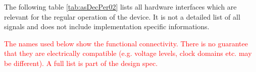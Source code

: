 The following table \ref{tab:asDecPer02} lists all hardware interfaces which are relevant for the regular operation of the device. It is not a detailed list of all signals and does not include implementation specific informations.

\textcolor{red}{The names used below show the functional connectivity. There is no guarantee that they are electrically compatible (e.g. voltage levels, clock domains etc. may be different). A full list is part of the design spec.}

